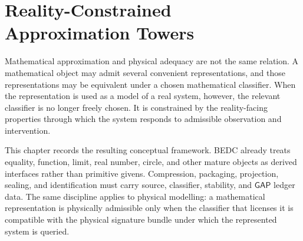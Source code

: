 \chapter{Reality-Constrained Approximation Towers}
\label{ch:visions-reality-constrained-approximation-towers}

Mathematical approximation and physical adequacy are not the same relation. A mathematical object may admit several convenient representations, and those representations may be equivalent under a chosen mathematical classifier. When the representation is used as a model of a real system, however, the relevant classifier is no longer freely chosen. It is constrained by the reality-facing properties through which the system responds to admissible observation and intervention.

This chapter records the resulting conceptual framework. BEDC already treats equality, function, limit, real number, circle, and other mature objects as derived interfaces rather than primitive givens. Compression, packaging, projection, sealing, and identification must carry source, classifier, stability, and $\mathsf{GAP}$ ledger data. The same discipline applies to physical modelling: a mathematical representation is physically admissible only when the classifier that licenses it is compatible with the physical signature bundle under which the represented system is queried.





























